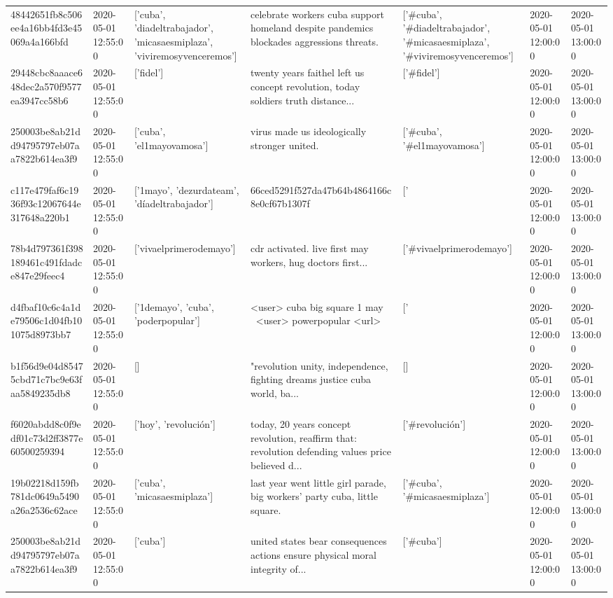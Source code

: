 \begin{tabular}{lllllll}
48442651fb8c506ee4a16bb4fd3e45069a4a166bfd & 2020-05-01 12:55:00 & ['cuba', 'diadeltrabajador', 'micasaesmiplaza', 'viviremosyvenceremos'] & celebrate workers cuba support homeland despite pandemics blockades aggressions threats. & ['#cuba', '#diadeltrabajador', '#micasaesmiplaza', '#viviremosyvenceremos'] & 2020-05-01 12:00:00 & 2020-05-01 13:00:00 \\
29448cbc8aaace648dec2a570f9577ea3947cc58b6 & 2020-05-01 12:55:00 & ['fidel'] & twenty years faithel left us concept revolution, today soldiers truth distance... & ['#fidel'] & 2020-05-01 12:00:00 & 2020-05-01 13:00:00 \\
250003be8ab21dd94795797eb07aa7822b614ea3f9 & 2020-05-01 12:55:00 & ['cuba', 'el1mayovamosa'] & virus made us ideologically stronger united. & ['#cuba', '#el1mayovamosa'] & 2020-05-01 12:00:00 & 2020-05-01 13:00:00 \\
c117e479faf6c1936f93c12067644e317648a220b1 & 2020-05-01 12:55:00 & ['1mayo', 'dezurdateam', 'díadeltrabajador'] & 66ced5291f527da47b64b4864166c8e0cf67b1307f & ['#1mayo', '#dezurdateam', '#díadeltrabajador'] & 2020-05-01 12:00:00 & 2020-05-01 13:00:00 \\
78b4d797361f398189461c491fdadce847e29feec4 & 2020-05-01 12:55:00 & ['vivaelprimerodemayo'] & cdr activated. live first may workers, hug doctors first... & ['#vivaelprimerodemayo'] & 2020-05-01 12:00:00 & 2020-05-01 13:00:00 \\
d4fbaf10c6c4a1de79506c1d04fb101075d8973bb7 & 2020-05-01 12:55:00 & ['1demayo', 'cuba', 'poderpopular'] & <user> cuba big square 1 may 👏👏👏👏<user> powerpopular <url> & ['#1demayo', '#cuba'] & 2020-05-01 12:00:00 & 2020-05-01 13:00:00 \\
b1f56d9e04d85475cbd71c7bc9e63faa5849235db8 & 2020-05-01 12:55:00 & [] & "revolution unity, independence, fighting dreams justice cuba world, ba... & [] & 2020-05-01 12:00:00 & 2020-05-01 13:00:00 \\
f6020abdd8c0f9edf01c73d2ff3877e60500259394 & 2020-05-01 12:55:00 & ['hoy', 'revolución'] & today, 20 years concept revolution, reaffirm that: revolution defending values price believed d... & ['#revolución'] & 2020-05-01 12:00:00 & 2020-05-01 13:00:00 \\
19b02218d159fb781dc0649a5490a26a2536c62ace & 2020-05-01 12:55:00 & ['cuba', 'micasaesmiplaza'] & last year went little girl parade, big workers' party cuba, little square. & ['#cuba', '#micasaesmiplaza'] & 2020-05-01 12:00:00 & 2020-05-01 13:00:00 \\
250003be8ab21dd94795797eb07aa7822b614ea3f9 & 2020-05-01 12:55:00 & ['cuba'] & united states bear consequences actions ensure physical moral integrity of... & ['#cuba'] & 2020-05-01 12:00:00 & 2020-05-01 13:00:00 \\

\end{tabular}
